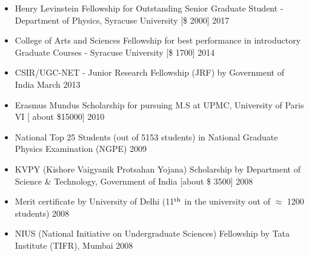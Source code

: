 
 \begin{itemize}
 \item Henry Levinstein Fellowship for Outstanding Senior Graduate Student - Department of Physics, Syracuse University [\$ 2000] \hfill 2017 
\item  College of Arts and Sciences Fellowship for best performance in introductory Graduate Courses - Syracuse University [\$ 1700] \hfill 2014 
 \item CSIR/UGC-NET - Junior Research Fellowship (JRF) by Government of India \hfill March 2013
 \item Erasmus Mundus Scholarship for pursuing M.S at UPMC, University of Paris VI  [ about \$15000] \hfill \textsc{2010}
 \item National Top 25 Students (out of 5153 students) in National Graduate Physics Examination (NGPE) \hfill \textsc{2009}
  \item KVPY (Kishore Vaigyanik Protsahan Yojana) Scholarship by Department of Science \& Technology, Government of India [about \$ 3500] \hfill 2008
 \item Merit certificate by University of Delhi (11$^{\rm{th}}$ in the university out of $\approx$ 1200 students) \hfill 2008
 \item NIUS (National Initiative on Undergraduate Sciences) Fellowship by Tata Institute (TIFR), Mumbai  \hfill 2008
 \end{itemize} 

